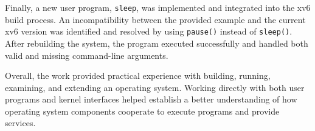 \documentclass{tum_report}
\begin{document}
Finally, a new user program, \texttt{sleep}, was implemented and
integrated into the xv6 build process. An incompatibility between
the provided example and the current xv6 version was identified
and resolved by using \texttt{pause()} instead of \texttt{sleep()}.
After rebuilding the system, the program executed successfully
and handled both valid and missing command-line arguments.

Overall, the work provided practical experience with building,
running, examining, and extending an operating system. Working
directly with both user programs and kernel interfaces helped
establish a better understanding of how operating system
components cooperate to execute programs and provide services.




\clearpage


%

\clearpage
\end{document}

